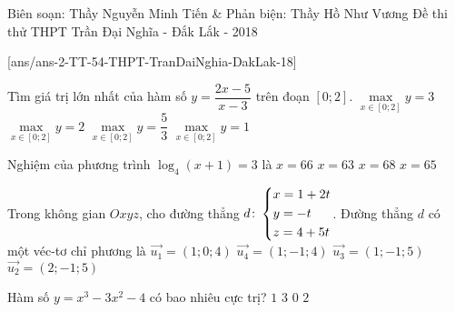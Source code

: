 \begin{name}
{Biên soạn: Thầy Nguyễn Minh Tiến \& Phản biện: Thầy Hồ Như Vương}
{Đề thi thử THPT Trần Đại Nghĩa - Đắk Lắk - 2018}
\end{name}
\setcounter{ex}{0}\setcounter{bt}{0}
[ans/ans-2-TT-54-THPT-TranDaiNghia-DakLak-18]
\begin{ex}%
Tìm giá trị lớn nhất của hàm số $y = \dfrac{2x - 5}{x - 3}$ trên đoạn $\left[0;2\right]$.
\choice
{$\underset{x \in \left[0;2\right]}{\max} y = 3$}
{$\underset{x \in \left[0;2\right]}{\max} y = 2$}
{\True $\underset{x \in \left[0;2\right]}{\max} y = \dfrac{5}{3}$}
{$\underset{x \in \left[0;2\right]}{\max} y = 1$}
\end{ex}
\begin{ex}%
Nghiệm của phương trình $\log_4 \left(x + 1\right) = 3$ là
\choice
{$x = 66$}
{\True $x = 63$}
{$x = 68$}
{$x = 65$}
\end{ex}
\begin{ex}%
Trong không gian $Oxyz$, cho đường thẳng $d\colon \left\{\begin{aligned}&x = 1 + 2t\\&y = - t\\&z = 4 + 5t\end{aligned}\right.$. Đường thẳng $d$ có một véc-tơ chỉ phương là
\choice
{$\overrightarrow{u_1} = \left(1;0;4\right)$}
{$\overrightarrow{u_4} = \left(1;-1;4\right)$}
{$\overrightarrow{u_3} = \left(1;-1;5\right)$}
{\True $\overrightarrow{u_2} = \left(2;-1;5\right)$}
\end{ex}
\begin{ex}%
Hàm số $y = x^3 - 3x^2 - 4$ có bao nhiêu cực trị?
\choice
{$1$}
{$3$}
{$0$}
{\True $2$}
\end{ex}
